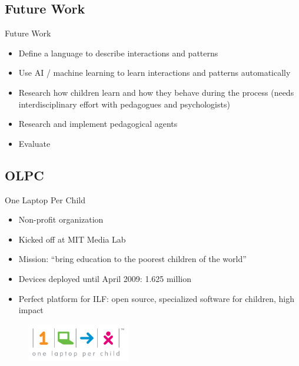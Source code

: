 \documentclass[compress]{beamer}
\begin{document}
\subsection{Future Work}

\begin{frame}{Future Work}
\begin{itemize}
\item Define a language to describe interactions and patterns
\item Use AI / machine learning to learn interactions and patterns automatically
\item Research how children learn and how they behave during the process (needs interdisciplinary effort with pedagogues and psychologists)
\item Research and implement pedagogical agents
\item Evaluate
\end{itemize}
\end{frame}

\subsection{OLPC}

\begin{frame}{One Laptop Per Child}
\begin{itemize}
\item Non-profit organization
\item Kicked off at MIT Media Lab
\item Mission: ``bring education to the poorest children of the world''
\item Devices deployed until April 2009: 1.625 million
\item Perfect platform for ILF: open source, specialized software for children, high impact 
\end{itemize}
\begin{figure}
    \centering
    \includegraphics[width=0.4\textwidth]{images/OLPC_LOGO.png}
\end{figure}
\end{frame}
\end{document}
